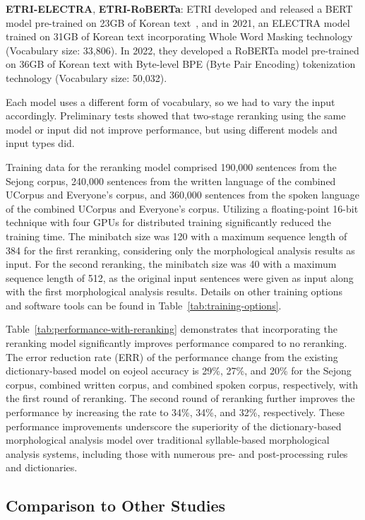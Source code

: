 \documentclass[AMS,STIX2COL]{WileyNJD-v2}
\begin{document}
    \textbf{ETRI-ELECTRA}, \textbf{ETRI-RoBERTa}: ETRI developed and released a BERT model pre-trained on 23GB of Korean text~\cite{KorBERT}, and in 2021, an ELECTRA model trained on 31GB of Korean text incorporating Whole Word Masking technology (Vocabulary size: 33,806).
    In 2022, they developed a RoBERTa model pre-trained on 36GB of Korean text with Byte-level BPE (Byte Pair Encoding) tokenization technology (Vocabulary size: 50,032).

    Each model uses a different form of vocabulary, so we had to vary the input accordingly.
    Preliminary tests showed that two-stage reranking using the same model or input did not improve performance, but using different models and input types did.

    Training data for the reranking model comprised 190,000 sentences from the Sejong corpus, 240,000 sentences from the written language of the combined UCorpus and Everyone's corpus, and 360,000 sentences from the spoken language of the combined UCorpus and Everyone's corpus.
    Utilizing a floating-point 16-bit technique with four GPUs for distributed training significantly reduced the training time.
    The minibatch size was 120 with a maximum sequence length of 384 for the first reranking, considering only the morphological analysis results as input.
    For the second reranking, the minibatch size was 40 with a maximum sequence length of 512, as the original input sentences were given as input along with the first morphological analysis results.
    Details on other training options and software tools can be found in Table~\ref{tab:training-options}.

    Table~\ref{tab:performance-with-reranking} demonstrates that incorporating the reranking model significantly improves performance compared to no reranking.
    The error reduction rate (ERR) of the performance change from the existing dictionary-based model on eojeol accuracy is 29\%, 27\%, and 20\% for the Sejong corpus, combined written corpus, and combined spoken corpus, respectively, with the first round of reranking.
    The second round of reranking further improves the performance by increasing the rate to 34\%, 34\%, and 32\%, respectively.
    These performance improvements underscore the superiority of the dictionary-based morphological analysis model over traditional syllable-based morphological analysis systems, including those with numerous pre- and post-processing rules and dictionaries.

    \subsection{Comparison to Other Studies}\label{subsec:comparison-to-other-studies}
\end{document}

